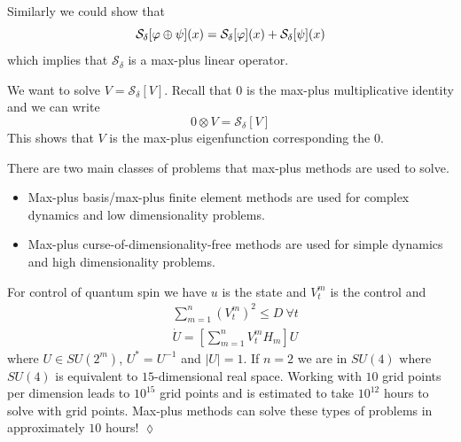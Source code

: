 Similarly we could show that
$$\mathcal{S}_\delta[\varphi\oplus\psi](x) = \mathcal{S}_\delta[\varphi](x) + \mathcal{S}_\delta[\psi](x)$$
which implies that $\mathcal{S}_\delta$ is a max-plus linear operator.

We want to solve $V=\mathcal{S}_\delta[V]$.
Recall that $0$ is the max-plus multiplicative identity and we can write
$$0\otimes V=\mathcal{S}_\delta[V]$$
This shows that $V$ is the max-plus eigenfunction corresponding the $0$.

There are two main classes of problems that max-plus methods are used to solve.
\begin{itemize}
\item Max-plus basis/max-plus finite element methods are used for complex dynamics and low dimensionality problems.
\item Max-plus curse-of-dimensionality-free methods are used for simple dynamics and high dimensionality problems.
\end{itemize}

\begin{example}
For control of quantum spin we have $u$ is the state and $V_t^m$ is the control and
\begin{align*}
&\sum_{m=1}^n{(V_t^m)}^2\leq D~\forall t \\
&\dot{U} = \left[\sum_{m=1}^n V_t^m H_m\right]U
\end{align*}
where $U\in SU(2^m)$, $U^\ast=U^{-1}$ and $|U|=1$.
If $n=2$ we are in $SU(4)$ where $SU(4)$ is equivalent to $15$-dimensional real space.
Working with $10$ grid points per dimension leads to $10^{15}$ grid points and is estimated to take $10^{12}$ hours to solve with grid points.
Max-plus methods can solve these types of problems in approximately $10$ hours!
$\lozenge$
\end{example}%
